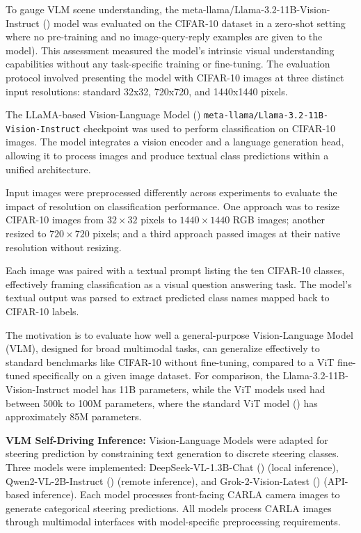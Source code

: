 To gauge VLM scene understanding, the meta-llama/Llama-3.2-11B-Vision-Instruct (\cite{meta2024llama3vision}) model was evaluated on the CIFAR-10 dataset in a zero-shot setting where no pre-training and no image-query-reply examples are given to the model). This assessment measured the model's intrinsic visual understanding capabilities without any task-specific training or fine-tuning. The evaluation protocol involved presenting the model with CIFAR-10 images at three distinct input resolutions: standard 32x32, 720x720, and 1440x1440 pixels. 

The LLaMA-based Vision-Language Model (\cite{touvron2023llamaopenefficientfoundation}) \texttt{meta-llama/Llama-3.2-11B-Vision-Instruct} checkpoint was used to perform classification on CIFAR-10 images. The model integrates a vision encoder and a language generation head, allowing it to process images and produce textual class predictions within a unified architecture.

Input images were preprocessed differently across experiments to evaluate the impact of resolution on classification performance. One approach was to resize CIFAR-10 images from $32 \times 32$ pixels to $1440 \times 1440$ RGB images; another resized to $720 \times 720$ pixels; and a third approach passed images at their native resolution without resizing.

Each image was paired with a textual prompt listing the ten CIFAR-10 classes, effectively framing classification as a visual question answering task. The model’s textual output was parsed to extract predicted class names mapped back to CIFAR-10 labels.

The motivation is to evaluate how well a general-purpose Vision-Language Model (VLM), designed for broad multimodal tasks, can generalize effectively to standard benchmarks like CIFAR-10 without fine-tuning, compared to a ViT fine-tuned specifically on a given image dataset. For comparison, the Llama-3.2-11B-Vision-Instruct model has 11B parameters, while the ViT models used had between 500k to 100M parameters, where the standard  ViT model (\cite{dosovitskiy17}) has approximately 85M parameters.

\textbf{VLM Self-Driving Inference:} Vision-Language Models were adapted for steering prediction by constraining text generation to discrete steering classes. Three models were implemented: DeepSeek-VL-1.3B-Chat (\cite{zeng2024deepseek}) (local inference), Qwen2-VL-2B-Instruct (\cite{bai2023qwen}) (remote inference), and Grok-2-Vision-Latest (\cite{xai2025grok2vision}) (API-based inference). Each model processes front-facing CARLA camera images to generate categorical steering predictions. All models process CARLA images through multimodal interfaces with model-specific preprocessing requirements.

